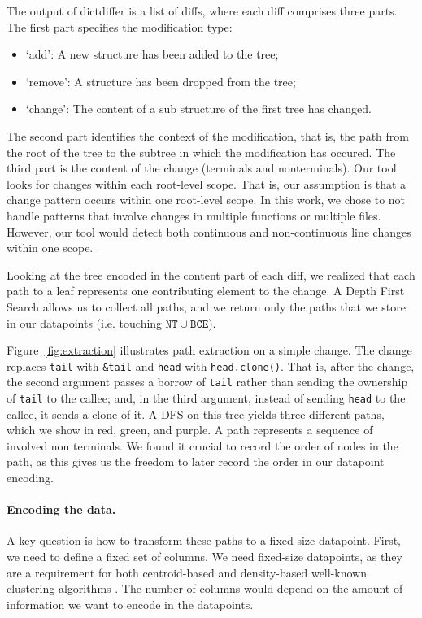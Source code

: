 The output of dictdiffer is a list of diffs, where each diff comprises three parts. The first part specifies the modification type:

\begin{itemize}
    \item `add': A new structure has been added to the tree; 
    \item `remove': A structure has been dropped from the tree; 
    \item `change': The content of a sub structure of the first tree has changed.
\end{itemize}

The second part identifies the context of the modification, that is, the path from the root of the tree to the subtree in which the modification has occured. The third part is the content of the change (terminals and nonterminals). Our tool looks for changes within each root-level scope. That is, our assumption is that a change pattern occurs within one root-level scope. In this work, we chose to not handle patterns that involve changes in multiple functions or multiple files. However, our tool would detect both continuous and non-continuous line changes within one scope.

Looking at the tree encoded in the content part of each diff, we realized that each path to a leaf represents one contributing element to the change. A Depth First Search allows us to collect all paths, and we return only the paths that we store in our datapoints (i.e. touching $\mathtt{NT} \cup \mathtt{BCE}$).

Figure~\ref{fig:extraction} illustrates path extraction on a simple change. The change replaces \verb+tail+ with \verb+&tail+ and \verb+head+ with \verb+head.clone()+. That is, after the change, the second argument passes a borrow of \verb+tail+ rather than sending the ownership of \verb+tail+ to the callee; and, in the third argument, instead of sending \verb+head+ to the callee, it sends a clone of it. A DFS on this tree yields three different paths, which we show in red, green, and purple. A path represents a sequence of involved non terminals. We found it crucial to record the order of nodes in the path, as this gives us the freedom to later record the order in our datapoint encoding.

\paragraph{Encoding the data.} A key question is how to transform these paths to a fixed size datapoint. First, we need to define a fixed set of columns. We need fixed-size datapoints, as they are a requirement for both centroid-based and density-based well-known clustering algorithms \cite{xu2005survey}. The number of columns would depend on the amount of information we want to encode in the datapoints. 

